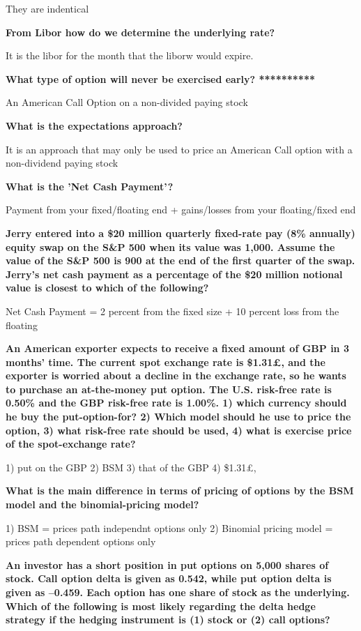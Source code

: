 \documentclass[12pt]{article}
\begin{document}
They are indentical

\textbf{From Libor how do we determine the underlying rate?}

It is the libor for the month that the liborw would expire.

\textbf{What type of option will never be exercised early? **********}

An American Call Option on a non-divided paying stock

\textbf{What is the expectations approach?}

It is an approach that may only be used to price an American Call option with a non-dividend paying stock

\textbf{What is the 'Net Cash Payment'?}

Payment from your fixed/floating end + gains/losses from your floating/fixed end

\textbf{Jerry entered into a \$20 million quarterly fixed-rate pay (8\% annually) equity swap on the S\&P 500 when its value was 1,000. Assume the value of the S\&P 500 is 900 at the end of the first quarter of the swap. Jerry's net cash payment as a percentage of the \$20 million notional value is closest to which of the following?}

Net Cash Payment = 2 percent from the fixed size + 10 percent loss from the floating

\textbf{An American exporter expects to receive a fixed amount of GBP in 3 months' time. The current spot exchange rate is \$1.31£, and the exporter is worried about a decline in the exchange rate, so he wants to purchase an at-the-money put option. The U.S. risk-free rate is 0.50\% and the GBP risk-free rate is 1.00\%. 1) which currency should he buy the put-option-for? 2) Which model should he use to price the option, 3) what risk-free rate should be used, 4) what is exercise price of the spot-exchange rate?}

1) put on the GBP
2) BSM
3) that of the GBP
4) \$1.31£, 

\textbf{What is the main difference in terms of pricing of options by the BSM model and the binomial-pricing model?}

1) BSM = prices path independnt options only
2) Binomial pricing model = prices path dependent options only	

\textbf{An investor has a short position in put options on 5,000 shares of stock. Call option delta is given as 0.542, while put option delta is given as –0.459. Each option has one share of stock as the underlying. Which of the following is most likely regarding the delta hedge strategy if the hedging instrument is (1) stock or (2) call options?}
\end{document}
